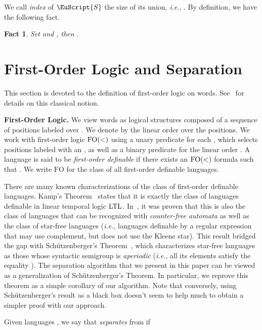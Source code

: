 \documentclass{CSML}
\newcommand\Ss{\ensuremath{\EuScript{S}}\xspace}
\newcommand{\ltl}{\ensuremath{\textup{LTL}}\xspace}
\newcommand{\fo}{\ensuremath{\text{FO}}\xspace}
\newcommand{\fow}{\ensuremath{\textup{FO}(<)}\xspace}
\theoremstyle{plain}
\newtheorem{fct}[thm]{Fact}
\begin{document}
We call \emph{index} of \Ss the size of its union, \emph{i.e.},
. By definition, we have the following
fact.

\begin{fct} \label{fct:uprod}
Set  and , then .
\end{fct}

\section{First-Order Logic and Separation}
\label{sec:fo}
This section is devoted to the definition of first-order logic on
words. See~\cite{Thomas:Languages-automata-logic:1997:a,Diekert&Gastin:First-order-definable-languages:2008:a,bookstraub} for details on
this classical notion.

\medskip
\noindent
{\textbf{First-Order Logic.}} We view words  as logical structures
composed of a sequence of positions labeled over . We denote by 
the linear order over the positions. We work with first-order logic
\fow using a unary predicate  for each ,
which selects
positions  labeled with an , as well as a binary predicate for the
linear order . A language  is said to be \emph{first-order definable} if there
exists an \fow formula  such that . We write \fo for the class of all first-order definable
languages.

There are many known characterizations of the class of first-order
definable languages. Kamp's Theorem~\cite{kltl} states that it is
exactly the class of languages definable in linear temporal logic
\ltl.  In~\cite{mnpfo}, it was proven that this is also the class of
languages that can be recognized with \emph{counter-free automata} as
well as the class of star-free languages (\emph{i.e.}, languages
definable by a regular expression that may use complement, but does
not use the Kleene star). This result bridged the gap with
Schützenberger's Theorem~\cite{sfo}, which characterizes star-free
languages as those whose syntactic semigroup is \emph{aperiodic} (\emph{i.e.},
all its elements  satisfy the equality ).
The separation algorithm that we present in this paper can be viewed
as a generalization of Schützenberger's Theorem. In particular, we
reprove this theorem as a simple corollary of our algorithm.
Note that conversely, using Sch\"utzenberger's result as a black box doesn't seem
to help much to obtain a simpler proof with our approach.

\medskip{} Given languages ,
we say that  \emph{separates}  from  if
\end{document}
